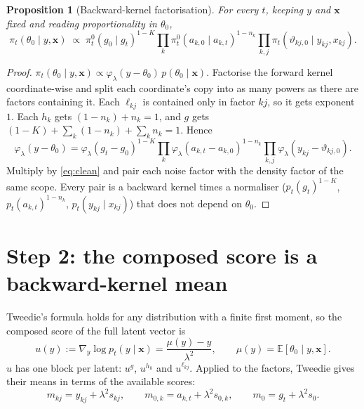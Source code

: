 \documentclass[11pt]{article}
\newtheorem{proposition}[theorem]{Proposition}
\theoremstyle{definition}
\theoremstyle{remark}
\newcommand{\E}{\mathbb{E}}
\newcommand{\lam}{\lambda}
\newcommand{\X}{\mathbf{x}}
\newcommand{\hk}{h_k}
\newcommand{\lkj}{\ell_{kj}}
\begin{document}
\begin{proposition}[Backward-kernel factorisation]\label{prop:backward}
For every $t$, keeping $y$ and $\X$ fixed and reading proportionality in $\theta_0$,
\begin{equation}\label{eq:backward}
\pi_t(\theta_0\mid y,\X)\;\propto\;\pi^0_t(g_0\mid g_t)^{1-K}\prod_{k}\pi^0_t(a_{k,0}\mid a_{k,t})^{1-n_k}\prod_{k,j}\pi_t(\vartheta_{kj,0}\mid y_{kj},x_{kj}).
\end{equation}
\end{proposition}
\begin{proof}
$\pi_t(\theta_0\mid y,\X)\propto\varphi_\lam(y-\theta_0)\,p(\theta_0\mid\X)$. Factorise
the forward kernel coordinate-wise and split each coordinate's copy into as many
powers as there are factors containing it. Each $\lkj$ is contained only in factor
$kj$, so it gets exponent $1$. Each $\hk$ gets $(1-n_k)+n_k=1$, and $g$ gets
$(1-K)+\sum_k(1-n_k)+\sum_kn_k=1$. Hence
\[
\varphi_\lam(y-\theta_0)=\varphi_\lam(g_t-g_0)^{1-K}\prod_k\varphi_\lam(a_{k,t}-a_{k,0})^{1-n_k}\prod_{k,j}\varphi_\lam(y_{kj}-\vartheta_{kj,0}).
\]
Multiply by \eqref{eq:clean} and pair each noise factor with the density factor
of the same scope. Every pair is a backward kernel times a normaliser
($p_t(g_t)^{1-K}$, $p_t(a_{k,t})^{1-n_k}$, $p_t(y_{kj}\mid x_{kj})$) that does not
depend on $\theta_0$.
\end{proof}

\section{Step 2: the composed score is a backward-kernel mean}

Tweedie's formula holds for any distribution with a finite first moment, so the
composed score of the full latent vector is
\begin{equation}\label{eq:tweedie}
u(y):=\nabla_y\log p_t(y\mid\X)=\frac{\mu(y)-y}{\lam^2},\qquad\mu(y)=\E[\theta_0\mid y,\X].
\end{equation}
$u$ has one block per latent: $u^g$, $u^{h_k}$ and $u^{\ell_{kj}}$. Applied to the
factors, Tweedie gives their means in terms of the available scores:
\begin{equation}\label{eq:factor-means}
m_{kj}=y_{kj}+\lam^2s_{kj},\qquad m_{0,k}=a_{k,t}+\lam^2s_{0,k},\qquad m_0=g_t+\lam^2s_0.
\end{equation}
\end{document}
